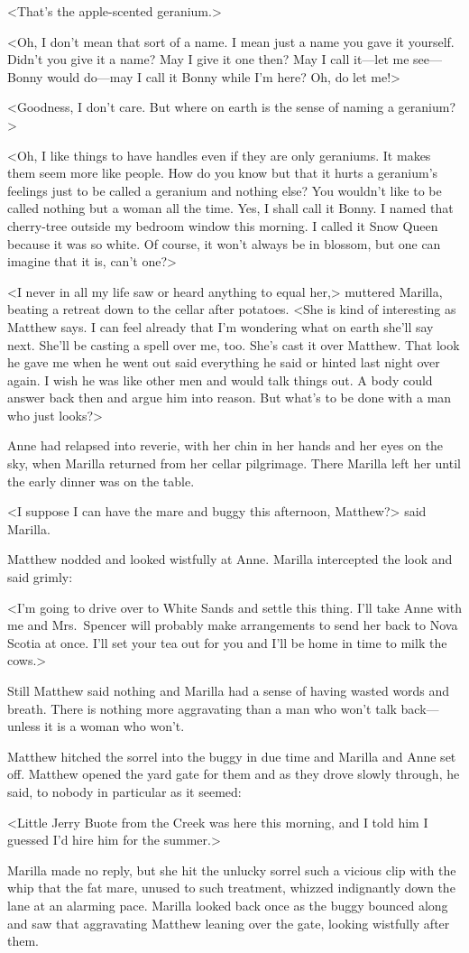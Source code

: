 <That's the apple-scented geranium.>

<Oh, I don't mean that sort of a name. I mean just a name you gave it yourself. Didn't you give it a name? May I give it one then? May I call it—let me see—Bonny would do—may I call it Bonny while I'm here? Oh, do let me!>

<Goodness, I don't care. But where on earth is the sense of naming a geranium?>

<Oh, I like things to have handles even if they are only geraniums. It makes them seem more like people. How do you know but that it hurts a geranium's feelings just to be called a geranium and nothing else? You wouldn't like to be called nothing but a woman all the time. Yes, I shall call it Bonny. I named that cherry-tree outside my bedroom window this morning. I called it Snow Queen because it was so white. Of course, it won't always be in blossom, but one can imagine that it is, can't one?>

<I never in all my life saw or heard anything to equal her,> muttered Marilla, beating a retreat down to the cellar after potatoes. <She is kind of interesting as Matthew says. I can feel already that I'm wondering what on earth she'll say next. She'll be casting a spell over me, too. She's cast it over Matthew. That look he gave me when he went out said everything he said or hinted last night over again. I wish he was like other men and would talk things out. A body could answer back then and argue him into reason. But what's to be done with a man who just looks?>

Anne had relapsed into reverie, with her chin in her hands and her eyes on the sky, when Marilla returned from her cellar pilgrimage. There Marilla left her until the early dinner was on the table.

<I suppose I can have the mare and buggy this afternoon, Matthew?> said Marilla.

Matthew nodded and looked wistfully at Anne. Marilla intercepted the look and said grimly:

<I'm going to drive over to White Sands and settle this thing. I'll take Anne with me and Mrs.~Spencer will probably make arrangements to send her back to Nova Scotia at once. I'll set your tea out for you and I'll be home in time to milk the cows.>

Still Matthew said nothing and Marilla had a sense of having wasted words and breath. There is nothing more aggravating than a man who won't talk back—unless it is a woman who won't.

Matthew hitched the sorrel into the buggy in due time and Marilla and Anne set off. Matthew opened the yard gate for them and as they drove slowly through, he said, to nobody in particular as it seemed:

<Little Jerry Buote from the Creek was here this morning, and I told him I guessed I'd hire him for the summer.>

Marilla made no reply, but she hit the unlucky sorrel such a vicious clip with the whip that the fat mare, unused to such treatment, whizzed indignantly down the lane at an alarming pace. Marilla looked back once as the buggy bounced along and saw that aggravating Matthew leaning over the gate, looking wistfully after them.

